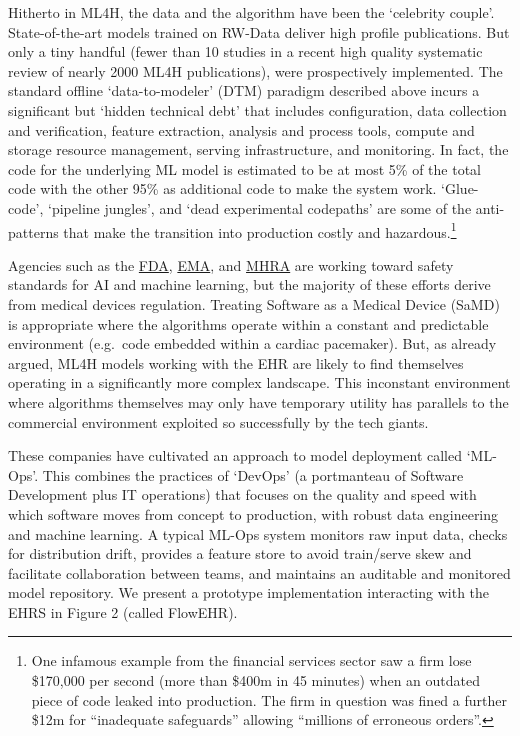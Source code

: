 Hitherto in ML4H, the data and the algorithm have been the `celebrity
couple'. State-of-the-art models trained on RW-Data deliver high profile
publications.\citep{tomasev2019, hyland2020} But only a tiny handful
(fewer than 10 studies in a recent high quality systematic review of
nearly 2000 ML4H publications\citep{ben-israel2020}), were prospectively
implemented. The standard offline `data-to-modeler' (DTM) paradigm
described above incurs a significant but `hidden technical debt' that
includes configuration, data collection and verification, feature
extraction, analysis and process tools, compute and storage resource
management, serving infrastructure, and monitoring.\citep{sculley2015}
In fact, the code for the underlying ML model is estimated to be at most
5\% of the total code with the other 95\% as additional code to make the
system work. `Glue-code', `pipeline jungles', and `dead experimental
codepaths' are some of the anti-patterns that make the transition into
production costly and hazardous.\footnote{One infamous example from the
  financial services sector saw a firm lose \$170,000 per second (more
  than \$400m in 45 minutes) when an outdated piece of code leaked into
  production. The firm in question was fined a further \$12m for
  ``inadequate safeguards'' allowing ``millions of erroneous
  orders''.\citep{2013}}

Agencies such as the \href{https://www.fda.gov}{FDA},
\href{https://www.ema.europa.eu/en}{EMA}, and
\href{https://www.gov.uk/government/organisations/medicines-and-healthcare-products-regulatory-agency}{MHRA}
are working toward safety standards for AI and machine learning, but the
majority of these efforts derive from medical devices regulation.
Treating Software as a Medical Device (SaMD) is appropriate where the
algorithms operate within a constant and predictable environment
(e.g.~code embedded within a cardiac pacemaker). But, as already argued,
ML4H models working with the EHR are likely to find themselves operating
in a significantly more complex landscape. This inconstant environment
where algorithms themselves may only have temporary utility has
parallels to the commercial environment exploited so successfully by the
tech giants.

These companies have cultivated an approach to model deployment called
`ML-Ops'. This combines the practices of `DevOps' (a portmanteau of
Software Development plus IT operations)\citep{2022b} that focuses on
the quality and speed with which software moves from concept to
production, with robust data engineering and machine learning. A typical
ML-Ops system monitors raw input data, checks for distribution drift,
provides a feature store to avoid train/serve skew and facilitate
collaboration between teams, and maintains an auditable and monitored
model repository.\citep{john2021} We present a prototype implementation
interacting with the EHRS in Figure 2 (called FlowEHR).

